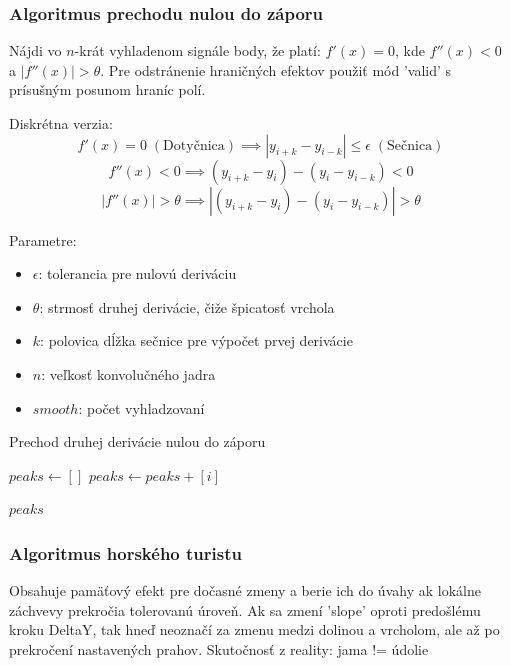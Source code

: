 \subsubsection{Algoritmus prechodu nulou do záporu}
Nájdi vo $n$-krát vyhladenom signále body, že platí: $f'(x) = 0$, kde $f''(x) < 0$ a $|f''(x)| > \theta$. Pre odstránenie hraničných efektov použiť mód 'valid' s prísušným posunom hraníc polí.

Diskrétna verzia:
$$f'(x) = 0 \; \mathrm{(Dotyčnica)} \implies |y_{i+k} - y_{i-k}| \leq \epsilon \;\mathrm{(Sečnica)}$$
$$f''(x) < 0 \implies (y_{i+k} - y_i) - (y_i - y_{i-k}) < 0$$
$$|f''(x)| > \theta \implies |(y_{i+k} - y_i) - (y_i - y_{i-k})| > \theta$$

Parametre:
\begin{itemize}
\item $\epsilon$: tolerancia pre nulovú deriváciu
\item $\theta$: strmosť druhej derivácie, čiže špicatosť vrchola
\item $k$: polovica dĺžka sečnice pre výpočet prvej derivácie
\item $n$: veľkosť konvolučného jadra
\item $smooth$: počet vyhladzovaní
\end{itemize}

\begin{algorithm}
\caption{Prechod druhej derivácie nulou do záporu}
\begin{algorithmic}[1]
	\State $peaks \gets []$
		    \State $peaks \gets peaks + [i]$
		
		\EndIf
	\EndFor
	\State \Return $peaks$
\EndFunction
\end{algorithmic}
\end{algorithm}

\subsubsection{Algoritmus horského turistu}
Obsahuje pamäťový efekt pre dočasné zmeny a berie ich do úvahy ak lokálne záchvevy prekročia tolerovanú úroveň. Ak sa zmení 'slope' oproti predošlému kroku DeltaY, tak hneď neoznačí za zmenu medzi dolinou a vrcholom, ale až po prekročení nastavených prahov. Skutočnosť z reality: jama != údolie 
\cite{peek-mountaineer-method}

